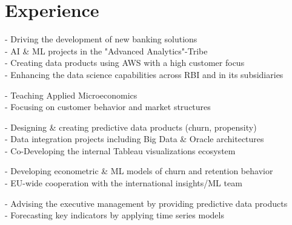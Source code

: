 \documentclass[a4paper]{twentysecondcv} %
\begin{document}

\section{Experience}

\begin{twenty} %

{\small - Driving the development of new banking solutions\\
        - AI \& ML projects in the "Advanced Analytics"-Tribe\\
        - Creating data products using AWS with a high customer focus\\
        - Enhancing the data science capabilities across RBI and in its subsidiaries        
}


{\small - Teaching Applied Microeconomics\\
        - Focusing on customer behavior and market structures
}	


{\small - Designing \& creating predictive data products (churn, propensity)\\
        - Data integration projects including Big Data \& Oracle architectures\\
        - Co-Developing the internal Tableau visualizations ecosystem 
}

	
{\small - Developing econometric \& ML models of churn and retention behavior\\
        - EU-wide cooperation with the international insights/ML team
}
	
{\small - Advising the executive management by providing predictive data products\\
        - Forecasting key indicators by applying time series models
}
	

\end{twenty}
\end{document}
